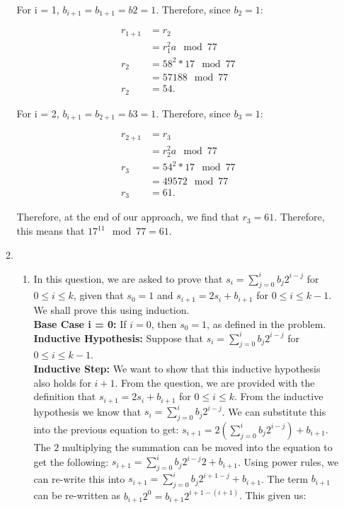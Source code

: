\documentclass[11pt]{article}
\theoremstyle{definition}
\newcounter{problem}
\begin{document}
\begin{enumerate}
\begin{enumerate}
For i = 1, $b_{i+1} = b_{1+1} = b{2} = 1$. Therefore, since $b_2 = 1$:

\begin{align*}
    r_{1+1} &= r_2 \\
    &= r_1^2a \mod{77} \\
    r_2 &= 58^2*17 \mod{77} \\
    &= 57188 \mod{77} \\
    r_2 &= 54.
\end{align*}

For i = 2, $b_{i+1} = b_{2+1} = b{3} = 1$. Therefore, since $b_3 = 1$:

\begin{align*}
    r_{2+1} &= r_3 \\
    &= r_2^2a \mod{77} \\
    r_3 &= 54^2*17 \mod{77} \\ 
    &= 49572 \mod{77} \\
    r_3 &= 61.
\end{align*}

Therefore, at the end of our approach, we find that $r_3 = 61$. Therefore, this means that $17^{11} \mod{77} = 61$.

\item
\begin{enumerate}
\item In this question, we are asked to prove that $s_i = \sum_{j=0}^i b_j2^{i-j}$ for $0 \leq i \leq k$, given that $s_0 = 1$ and $s_{i+1} = 2s_i + b_{i+1}$ for $0 \leq i \leq k - 1$. We shall prove this using induction. \\

\textbf{Base Case i = 0:} If $i = 0$, then $s_0 = 1$, as defined in the problem.\\

\textbf{Inductive Hypothesis:} Suppose that $s_i = \sum_{j=0}^i b_j2^{i-j}$ for $0 \leq i \leq k - 1$. \\

\textbf{Inductive Step:} We want to show that this inductive hypothesis also holds for $i+1$. From the question, we are provided with the definition that $s_{i+1} = 2s_i + b_{i+1}$ for $0 \leq i \leq k$. From the inductive hypothesis we know that $s_i = \sum_{j=0}^i b_j2^{i-j}$. We can substitute this into the previous equation to get: $s_{i+1} = 2(\sum_{j=0}^i b_j2^{i-j}) + b_{i+1}$. The $2$ multiplying the summation can be moved into the equation to get the following: $s_{i+1} = \sum_{j=0}^i b_j2^{i-j}2 + b_{i+1}$. Using power rules, we can re-write this into $s_{i+1} = \sum_{j=0}^i b_j2^{i+1-j} + b_{i+1}$. The term $b_{i+1}$ can be re-written as $b_{i+1}2^0 = b_{i+1}2^{i+1-(i+1)}$. This given us:


\end{enumerate}
\end{enumerate}
\end{enumerate}
\end{document}
